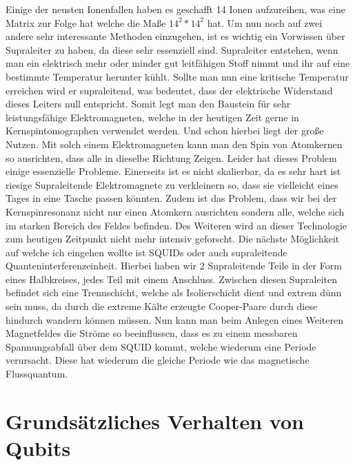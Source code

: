 \documentclass[12pt]{report}
\begin{document}
Einige der neusten Ionenfallen haben es geschafft 14 Ionen aufzureihen, was eine Matrix zur Folge hat welche die Maße $14^2 * 14^2$ hat. 
Um nun noch auf zwei andere sehr interessante Methoden einzugehen, ist es wichtig ein Vorwissen über Supraleiter zu haben, da diese sehr essenziell sind. Supraleiter entstehen, wenn man ein elektrisch mehr oder minder gut leitfähigen Stoff nimmt und ihr auf eine bestimmte Temperatur herunter kühlt. Sollte man nun eine kritische Temperatur erreichen wird er supraleitend, was bedeutet, dass der elektrische Widerstand dieses Leiters null entspricht. Somit legt man den Baustein für sehr leistungsfähige Elektromagneten, welche in der heutigen Zeit gerne in Kernspintomographen verwendet werden. Und schon hierbei liegt der große Nutzen. Mit solch einem Elektromagneten kann man den Spin von Atomkernen so ausrichten, dass alle in dieselbe Richtung Zeigen. Leider hat dieses Problem einige essenzielle Probleme. Einerseits ist es nicht skalierbar, da es sehr hart ist riesige Supraleitende Elektromagnete zu verkleinern so, dass sie vielleicht eines Tages in eine Tasche passen könnten. Zudem ist das Problem, dass wir bei der Kernspinresonanz nicht nur einen Atomkern ausrichten sondern alle, welche sich im starken Bereich des Feldes befinden. Des Weiteren wird an dieser Technologie zum heutigen Zeitpunkt nicht mehr intensiv geforscht.   
Die nächste Möglichkeit auf welche ich eingehen wollte ist SQUIDs oder auch supraleitende Quanteninterferenzeinheit. Hierbei haben wir 2 Supraleitende Teile in der Form eines Halbkreises, jedes Teil mit einem Anschluss. Zwischen diesen Supraleiten befindet sich eine Trennschicht, welche als Isolierschicht dient und extrem dünn sein muss, da durch die extreme Kälte erzeugte Cooper-Paare durch diese hindurch wandern können müssen. Nun kann man beim Anlegen eines Weiteren Magnetfeldes die Ströme so beeinflussen, dass es zu einem messbaren Spannungsabfall über dem SQUID kommt, welche wiederum eine Periode verursacht. Diese hat wiederum die gleiche Periode wie das magnetische Flussquantum.

\section{Grundsätzliches Verhalten von Qubits}
\end{document}
